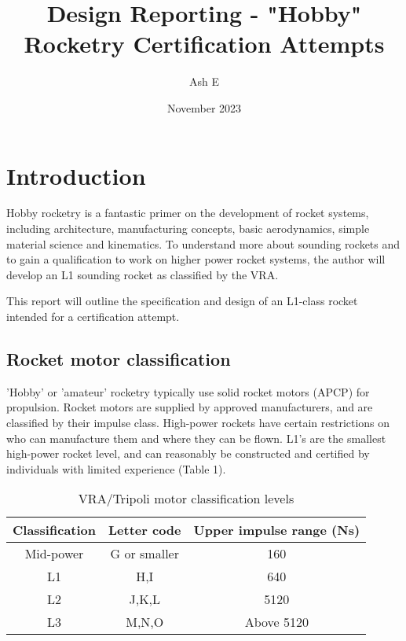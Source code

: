 \documentclass{article}
\title{Design Reporting - "Hobby" Rocketry Certification Attempts}
\author{Ash E}
\date{November 2023}
\begin{document}
\maketitle

\section{Introduction}

    Hobby rocketry is a fantastic primer on the development of rocket systems, including architecture, manufacturing concepts, basic aerodynamics, simple material science and kinematics. To understand more about sounding rockets and to gain a qualification to work on higher power rocket systems, the author will develop an L1 sounding rocket as classified by the VRA.
    
    This report will outline the specification and design of an L1-class rocket intended for a certification attempt.

    \subsection{Rocket motor classification}
    
        'Hobby' or 'amateur' rocketry typically use solid rocket motors (APCP) for propulsion. Rocket motors are supplied by approved manufacturers, and are classified by their impulse class.
        High-power rockets have certain restrictions on who can manufacture them and where they can be flown.
        L1's are the smallest high-power rocket level, and can reasonably be constructed and certified by individuals with limited experience (Table 1).

        \begin{table}[]
            \centering
            \begin{tabular}{c|c|c}
                 Classification & Letter code & Upper impulse range (Ns) \\
                 \hline
                 Mid-power & G or smaller & 160 \\
                 L1 & H,I & 640 \\
                 L2 & J,K,L & 5120 \\
                 L3 & M,N,O & Above 5120\\
            \end{tabular}
            \caption{VRA/Tripoli motor classification levels}
            \label{tab:my_label}
        \end{table}
\end{document}
